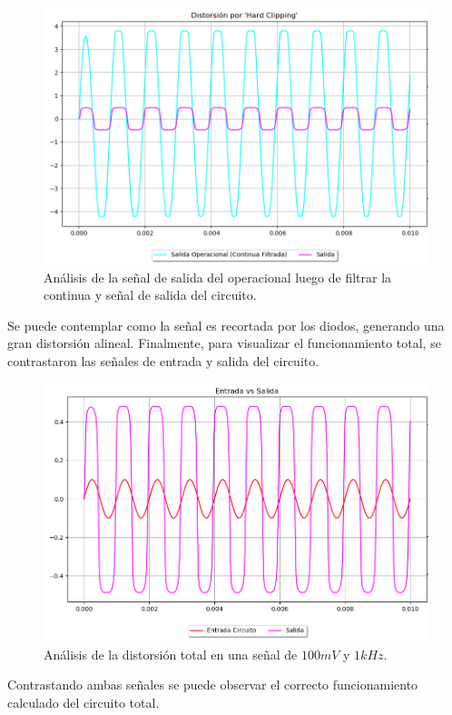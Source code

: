 \begin{figure}[H]
	\centering
	\includegraphics[width=1\textwidth, trim={0 0 0 0}, clip]{Ejercicio5/Imagenes/Circuito_base/Sim/circuito_base_tran_vclip_vo.png}
	\caption{Análisis de la señal de salida del operacional luego de filtrar la continua y señal de salida del circuito.}
	\label{fig:sim_base}
\end{figure}
Se puede contemplar como la señal es recortada por los diodos, generando una gran distorsión alineal.
Finalmente, para visualizar el funcionamiento total, se contrastaron las señales de entrada y salida del circuito.
\begin{figure}[H]
	\centering
	\includegraphics[width=1\textwidth, trim={0 0 0 0}, clip]{Ejercicio5/Imagenes/Circuito_base/Sim/circuito_base_tran_vi_vo.png}
	\caption{Análisis de la distorsión total en una señal de $100mV$ y $1kHz$.}
	\label{fig:sim_base}
\end{figure}
Contrastando ambas señales se puede observar el correcto funcionamiento calculado del circuito total.
